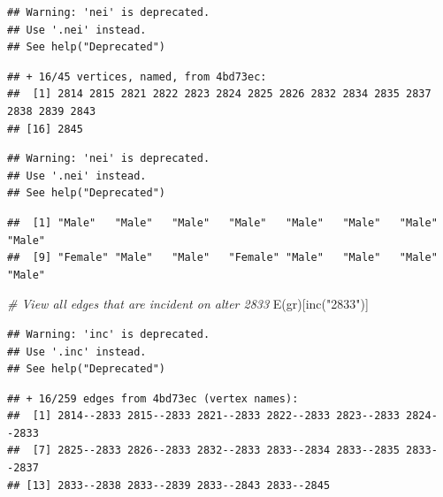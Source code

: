 \documentclass[
]{book}
\newenvironment{Shaded}{\begin{snugshade}}{\end{snugshade}}
\newcommand{\CommentTok}[1]{\textcolor[rgb]{0.56,0.35,0.01}{\textit{#1}}}
\newcommand{\FunctionTok}[1]{\textcolor[rgb]{0.00,0.00,0.00}{#1}}
\newcommand{\NormalTok}[1]{#1}
\newcommand{\SpecialCharTok}[1]{\textcolor[rgb]{0.00,0.00,0.00}{#1}}
\newcommand{\StringTok}[1]{\textcolor[rgb]{0.31,0.60,0.02}{#1}}
\begin{document}
\begin{verbatim}
## Warning: 'nei' is deprecated.
## Use '.nei' instead.
## See help("Deprecated")
\end{verbatim}

\begin{verbatim}
## + 16/45 vertices, named, from 4bd73ec:
##  [1] 2814 2815 2821 2822 2823 2824 2825 2826 2832 2834 2835 2837 2838 2839 2843
## [16] 2845
\end{verbatim}

\begin{Shaded}
\end{Shaded}

\begin{verbatim}
## Warning: 'nei' is deprecated.
## Use '.nei' instead.
## See help("Deprecated")
\end{verbatim}

\begin{verbatim}
##  [1] "Male"   "Male"   "Male"   "Male"   "Male"   "Male"   "Male"   "Male"  
##  [9] "Female" "Male"   "Male"   "Female" "Male"   "Male"   "Male"   "Male"
\end{verbatim}

\begin{Shaded}
\begin{Highlighting}[]
\CommentTok{\# View all edges that are incident on alter 2833}
\FunctionTok{E}\NormalTok{(gr)[}\FunctionTok{inc}\NormalTok{(}\StringTok{"2833"}\NormalTok{)]}
\end{Highlighting}
\end{Shaded}

\begin{verbatim}
## Warning: 'inc' is deprecated.
## Use '.inc' instead.
## See help("Deprecated")
\end{verbatim}

\begin{verbatim}
## + 16/259 edges from 4bd73ec (vertex names):
##  [1] 2814--2833 2815--2833 2821--2833 2822--2833 2823--2833 2824--2833
##  [7] 2825--2833 2826--2833 2832--2833 2833--2834 2833--2835 2833--2837
## [13] 2833--2838 2833--2839 2833--2843 2833--2845
\end{verbatim}
\end{document}
